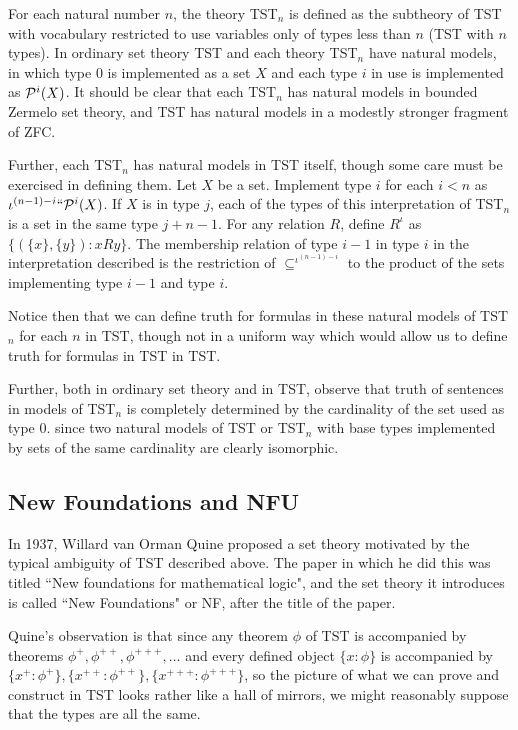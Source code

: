 \documentclass[12pt]{article}
\begin{document}
For each natural number $n$, the theory TST$_n$ is defined as the subtheory of TST with vocabulary restricted to use variables only of types less than $n$ (TST with $n$ types).
In ordinary set theory TST and each theory TST$_n$ have natural models, in which type 0 is implemented as a set $X$ and each type $i$ in use is implemented as ${\cal P}^i(X)$.  It should be clear that each TST$_n$ has natural models in bounded Zermelo set theory, and TST has natural models in a modestly stronger fragment of ZFC.

Further, each TST$_n$ has natural models in TST itself, though some care must be exercised in defining them.  Let $X$ be a set.  Implement type $i$ for each $i<n$ as
$\iota^{(n-1)-i}``{\cal P}^i(X)$.  If $X$ is in type $j$, each of the types of this interpretation of TST$_n$ is a set in the same type $j+n-1$.  For any relation $R$, define
$R^{\iota}$ as $\{(\{x\},\{y\}):x R y\}$.  The membership relation of type $i-1$ in type $i$ in the interpretation described is the restriction of $\subseteq^{\iota^{(n-1)-i}}$ to
the product of the sets implementing type $i-1$ and type $i$.

Notice then that we can define truth for formulas in these natural models of TST$_n$ for each $n$ in TST, though not in a uniform way which would allow us to define truth for formulas
in TST in TST.

Further, both in ordinary set theory and in TST, observe that truth of sentences in models of TST$_n$ is completely determined by the cardinality of the set used as type 0.
since two natural models of TST or TST$_n$ with base types implemented by sets of the same cardinality are clearly isomorphic. 

\newpage

\subsection{New Foundations and NFU}

In 1937, Willard van Orman Quine proposed a set theory motivated by the typical ambiguity of TST described above.  The paper in which he did this was titled ``New foundations for mathematical logic", and the set theory it introduces is called ``New Foundations" or NF, after the title of the paper.

Quine's observation is that since any theorem $\phi$ of TST is accompanied by theorems $\phi^+, \phi^{++}, \phi^{+++}, \ldots$ and every defined object $\{x:\phi\}$ is accompanied by
$\{x^+:\phi^+\},\{x^{++}:\phi^{++}\},\{x^{+++}:\phi^{+++}\}$, so the picture of what we can prove and construct in TST looks rather like a hall of mirrors, we might reasonably suppose that the types are all the same.
\end{document}
